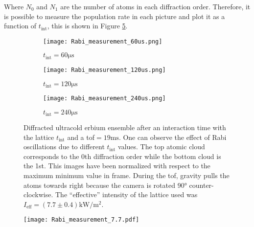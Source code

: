 Where $N_0$ and $N_1$ are the number of atoms in each diffraction order. Therefore, it is possible to measure the population rate in each picture and plot it as a function of $t_\text{int}$, this is shown in Figure \ref{fig:Bragg_measurement}.

\begin{figure}[!htbp]
	\centering
	\begin{subfigure}{.33\textwidth}
		\centering
		\texttt{[image: Rabi\_measurement\_60us.png]}
		\caption{ $t_\text{int} = 60\si{\micro\second}$}
		\label{fig:Bragg_images_1}
	\end{subfigure}%
	\begin{subfigure}{.33\textwidth}
		\centering
		\texttt{[image: Rabi\_measurement\_120us.png]}
		\caption{ $t_\text{int} = 120\si{\micro\second}$}
		\label{fig:Bragg_images_2}
	\end{subfigure}
	\begin{subfigure}{.33\textwidth}
		\centering
		\texttt{[image: Rabi\_measurement\_240us.png]}
		\caption{ $t_\text{int} = 240\si{\micro\second}$}
		\label{fig:Bragg_images_3}
	\end{subfigure}
	\caption[Diffracted ultracold erbium ensemble after an interaction time with the lattice $t_\text{int}$ and a \ac{tof}$=19\si{\milli\second}$]{Diffracted ultracold erbium ensemble after an interaction time with the lattice $t_\text{int}$ and a \ac{tof}$=19\si{\milli\second}$. One can observe the effect of Rabi oscillations due to different $t_\text{int}$ values. The top atomic cloud corresponds to the 0th diffraction order while the bottom cloud is the 1st. This images have been normalized with respect to the maximum minimum value in frame. During the \ac{tof}, gravity pulls the atoms towards right because the camera is rotated 90° counter-clockwise. The ``effective'' intensity of the lattice used was $I_\text{eff} = (7.7 \pm 0.4)\si{\kilo\watt\per\meter\squared}$.}
	\label{fig:Bragg_images}
\end{figure}

\begin{figure}[!htbp]\centering
	\texttt{[image: Rabi\_measurement\_7.7.pdf]}
	\caption[]{}\label{fig:Bragg_measurement}
\end{figure}
